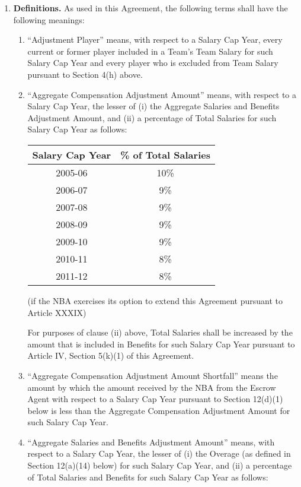 \documentclass[
]{book}
\providecommand{\tightlist}{%
  \setlength{\itemsep}{0pt}\setlength{\parskip}{0pt}}
\begin{document}
\begin{enumerate}
\def\labelenumi{(\alph{enumi})}
\tightlist
\item
  \textbf{Definitions.} As used in this Agreement, the following terms shall have the following meanings:

  \begin{enumerate}
  \def\labelenumii{(\arabic{enumii})}
  \item
    ``Adjustment Player'' means, with respect to a Salary Cap Year, every current or former player included in a Team's Team Salary for such Salary Cap Year and every player who is excluded from Team Salary pursuant to Section 4(h) above.
  \item
    ``Aggregate Compensation Adjustment Amount'' means, with respect to a Salary Cap Year, the lesser of (i) the Aggregate Salaries and Benefits Adjustment Amount, and (ii) a percentage of Total Salaries for such Salary Cap Year as follows:

    \begin{longtable}[]{@{}cc@{}}
    \toprule()
    Salary Cap Year & \% of Total Salaries \\
    \midrule()
    \endhead
    2005-06 & 10\% \\
    2006-07 & 9\% \\
    2007-08 & 9\% \\
    2008-09 & 9\% \\
    2009-10 & 9\% \\
    2010-11 & 8\% \\
    2011-12 & 8\% \\
    \bottomrule()
    \end{longtable}

    (if the NBA exercises its option to extend this Agreement pursuant to Article XXXIX)

    For purposes of clause (ii) above, Total Salaries shall be increased by the amount that is included in Benefits for such Salary Cap Year pursuant to Article IV, Section 5(k)(1) of this Agreement.
  \item
    ``Aggregate Compensation Adjustment Amount Shortfall'' means the amount by which the amount received by the NBA from the Escrow Agent with respect to a Salary Cap Year pursuant to Section 12(d)(1) below is less than the Aggregate Compensation Adjustment Amount for such Salary Cap Year.
  \item
    ``Aggregate Salaries and Benefits Adjustment Amount'' means, with respect to a Salary Cap Year, the lesser of (i) the Overage (as defined in Section 12(a)(14) below) for such Salary Cap Year, and (ii) a percentage of Total Salaries and Benefits for such Salary Cap Year as follows:


\end{enumerate}
\end{enumerate}
\end{document}

